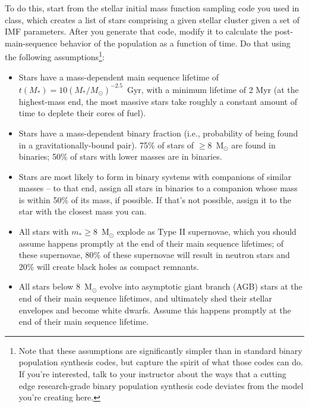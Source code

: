 \documentclass[10pt]{article}
\begin{document}
To do this, start from the stellar initial mass function sampling code
you used in class, which creates a list of stars comprising a given
stellar cluster given a set of IMF parameters.  After you generate that code,
modify it to calculate the post-main-sequence behavior of the
population as a function of time.  Do that using the following
assumptions\footnote{Note that these assumptions are significantly
  simpler than in standard binary population synthesis codes, but
  capture the spirit of what those codes can do.  If you're
  interested, talk to your
  instructor about the ways that a cutting edge research-grade binary
  population synthesis code deviates from the model you're creating here.}:

\begin{itemize}
  \item Stars have a mass-dependent main sequence lifetime of $t(M_*) = 10
    (M_*/M_\odot)^{-2.5}$~Gyr, with a minimum lifetime of 2 Myr (at
    the highest-mass end, the most massive stars take roughly a
    constant amount of time to deplete their cores of fuel).

  \item Stars have a mass-dependent binary fraction (i.e., probability
    of being found in a gravitationally-bound pair).  75\% of stars of $\geq
    8$~M$_\odot$ are found in binaries; 50\% of stars with lower
    masses are in binaries.

  \item Stars are most likely to form in binary
    systems with companions of similar masses -- to that end, assign
    all stars in binaries to a companion whose mass is within 50\% of
    its mass, if possible.  If that's not possible, assign it to the
    star with the closest mass you can.

  \item All stars with $m_* \geq 8$~M$_\odot$ explode as Type II
    supernovae, which you should assume happens promptly at the end of their
    main sequence lifetimes; of these supernovae, 80\% of these
    supernovae will result in neutron stars
    and 20\% will create black holes as compact remnants.
 
  \item All stars below 8~M$_\odot$ evolve into asymptotic giant branch
    (AGB) stars at the end of their main sequence lifetimes, and
    ultimately shed their stellar envelopes and become white dwarfs.
    Assume this happens promptly at the end of their main sequence
    lifetime.


\end{itemize}
\end{document}

